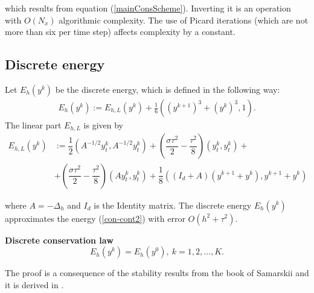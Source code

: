 \documentclass[%
 aip,
cp,  
 amsmath,amssymb,
 reprint,
]{iopconfser}
\newcommand{\rf}[1]{(\ref{#1})}
\begin{document}
which results from equation \rf{mainConsScheme}. Inverting it is an operation with $ O( N_x ) $ algorithmic complexity. The use of Picard iterations (which are not more than six per time step) affects complexity by a constant.
\subsection{Discrete energy}

Let $E_h (y^k)$ be the discrete energy, which is defined in the following way:
\begin{eqnarray}\label{energy1}
E_h (y^k):=E_{h,L} (y^k) +\frac{1}{6}((y^{k+1})^3+(y^{k})^3,1).
\end{eqnarray}
The linear part $E_{h,L}$ is given by
\begin{align*}\label{den}
E_{h,L}\left( y^k \right)&:= 
\dfrac{1}{2}\left(A^{-1/2}y_t^k,A^{-1/2}y_t^k\right)+\left(\dfrac{\sigma\tau^2}{2}-\dfrac{\tau^2}{8}\right)\left(y_t^k,y_t^k\right)+\nonumber\\&+\left(\dfrac{\sigma\tau^2}{2}-\dfrac{\tau^2}{8}\right) \left(Ay_t^k,y_t^k\right)
+\dfrac{1}{8}\left(\left(I_d+A\right)\left(y^{k+1}+y^k\right),y^{k+1}+y^k\right)
\end{align*}

where $A=-\Delta_h$ and $I_d$ is the Identity matrix. The discrete energy $E_h (y^k)$ approximates the energy \rf{con-cont2} with error $O(h^2+\tau^2)$.


{\textbf{Discrete conservation law}}
	$$E_h(y^k)=E_h(y^0),~k=1,2,...,K.$$

The proof is a consequence of the stability results from the book of Samarskii \cite{samarski} and it is derived in \cite{consCitat}.
\end{document}
